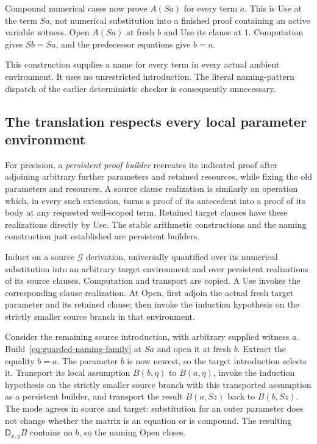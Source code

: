Compound numerical cases now prove $A(Sa)$ for every term $a$.
This is Use at the term $Sa$, not numerical substitution into a
finished proof containing an active variable witness.  Open $A(Sa)$
at fresh $b$ and Use its clause at $1$.  Computation gives
$Sb=Sa$, and the predecessor equations give $b=a$.

This construction supplies a name for every term in every actual
ambient environment.  It uses no unrestricted introduction.  The
literal naming-pattern dispatch of the earlier deterministic checker
is consequently unnecessary.

\subsection{The translation respects every local parameter environment}

For precision, a \emph{persistent proof builder} recreates its indicated
proof after adjoining arbitrary further parameters and retained
resources, while fixing the old parameters and resources.  A source
clause realization is similarly an operation which, in every such
extension, turns a proof of its antecedent into a proof of its body at
any requested well-scoped term.  Retained target clauses have these
realizations directly by Use.  The stable arithmetic constructions and
the naming construction just established are persistent builders.

Induct on a source $\mathcal G$ derivation, universally quantified
over its numerical substitution into an arbitrary target environment
and over persistent realizations of its source clauses.  Computation
and transport are copied.  A Use invokes the corresponding clause
realization.  At Open, first adjoin the actual fresh target parameter
and its retained clause; then invoke the induction hypothesis on the
strictly smaller source branch in that environment.

Consider the remaining source introduction, with arbitrary supplied
witness $a$.  Build~\eqref{eq:guarded-naming-family} at $Sa$ and
open it at fresh $b$.  Extract the equality $b=a$.  The parameter $b$
is now newest, so the target introduction selects it.  Transport its
local assumption $B(b,\eta)$ to $B(a,\eta)$, invoke the induction
hypothesis on the strictly smaller source branch with this transported
assumption as a persistent builder, and transport the result
$B(a,Sz)$ back to $B(b,Sz)$.  The mode agrees in source and target:
substitution for an outer parameter does not change whether the
matrix is an equation or is compound.  The resulting
$\mathsf D_{x,y}B$ contains no $b$, so the naming Open closes.


